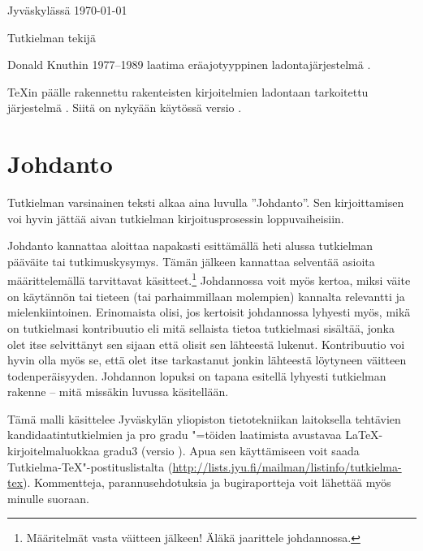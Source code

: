 \documentclass[utf8]{gradu3}
\begin{document}
Jyväskylässä \today

\bigskip

Tutkielman tekijä

\begin{thetermlist}
\item[\TeX] Donald Knuthin 1977--1989 laatima eräajotyyppinen
  ladontajärjestelmä \parencite[ks.][]{knuth86:_texbook}. 
\item[\LaTeX] \TeX in \parencite[ks.][]{knuth86:_texbook} päälle
  rakennettu rakenteisten kirjoitelmien ladontaan tarkoitettu
  järjestelmä \parencite[ks.][]{lamport94:_latex}.  Siitä on nykyään
  käytössä versio \LaTeXe.
\end{thetermlist}

\mainmatter

\chapter{Johdanto}

Tutkielman varsinainen teksti alkaa aina luvulla ''Johdanto''.  Sen
kirjoittamisen voi hyvin jättää aivan tutkielman kirjoitusprosessin
loppuvaiheisiin.

Johdanto kannattaa aloittaa napakasti esittämällä heti alussa
tutkielman pääväite tai tutkimuskysymys.  Tämän jälkeen kannattaa
selventää asioita määrittelemällä tarvittavat
käsitteet.\footnote{Määritelmät vasta väitteen jälkeen! Äläkä
  jaarittele johdannossa.}  Johdannossa voit myös kertoa, miksi väite
on käytännön tai tieteen (tai parhaimmillaan molempien) kannalta
relevantti ja mielenkiintoinen.  Erinomaista olisi, jos kertoisit
johdannossa lyhyesti myös, mikä on tutkielmasi kontribuutio eli mitä
sellaista tietoa tutkielmasi sisältää, jonka olet itse selvittänyt sen
sijaan että olisit sen lähteestä lukenut.  Kontribuutio voi hyvin olla
myös se, että olet itse tarkastanut jonkin lähteestä löytyneen
väitteen todenperäisyyden.  Johdannon lopuksi on tapana esitellä
lyhyesti tutkielman rakenne -- mitä missäkin luvussa käsitellään.

Tämä malli käsittelee Jyväskylän yliopiston tietotekniikan laitoksella
tehtävien kandidaatintutkielmien ja pro gradu "=töiden laatimista
avustavaa \LaTeX-kirjoitelmaluokkaa gradu3 (versio \graduclsversion).
Apua sen käyttämiseen voit saada Tutkielma-TeX"-postituslistalta
(\url{http://lists.jyu.fi/mailman/listinfo/tutkielma-tex}).
Kommentteja, parannusehdotuksia ja bugiraportteja voit lähettää myös
minulle suoraan.
\end{document}
